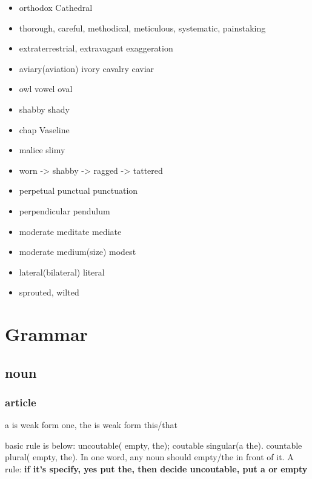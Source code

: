 \documentclass[a4paper,11pt,twoside]{book}
\begin{document}
\begin{itemize}
	\item orthodox Cathedral
	
	\item thorough, careful, methodical, meticulous, systematic, painstaking
	
	\item extraterrestrial, extravagant exaggeration
	
	\item aviary(aviation) ivory cavalry caviar 
	
	\item owl vowel oval
	
	\item shabby shady
	
	\item chap Vaseline 
	
	\item malice slimy
	
	\item worn -> shabby -> ragged -> tattered
	
	\item perpetual punctual punctuation
	
	\item perpendicular pendulum
	
	\item moderate meditate mediate
	
	\item moderate medium(size) modest
	
	\item lateral(bilateral) literal 
	
	\item sprouted, wilted
\end{itemize}



\chapter{Grammar}

\section{noun}

\subsection{article}
\par a is weak form one, the is weak form this/that

\par basic rule is below: uncoutable( empty, the); coutable singular(a the). countable plural( empty, the).  In one word, any noun should empty/the in front of it. A rule: \textbf{if it's specify, yes put the, then decide uncoutable, put a or empty}
\end{document}
